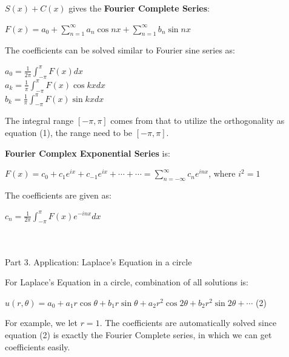 \documentclass{article}
\newenvironment{nscenter}
{\parskip=0pt\par\nopagebreak\centering}
{\par\noindent\ignorespacesafterend}
\begin{document}
\begin{spacing}{1.5}
$S(x) + C(x)$ gives the {\bfseries Fourier Complete Series}:
\begin{nscenter}
	$F(x)=a_0 + \sum_{n=1}^{\infty}a_n \cos nx + \sum_{n=1}^{\infty}b_n \sin nx$
\end{nscenter}
The coefficients can be solved similar to Fourier sine series as:
\begin{nscenter}
	$a_0 = \frac{1}{2\pi} \int_{-\pi}^{\pi} F(x) dx$ \\
	$a_k = \frac{1}{\pi} \int_{-\pi}^{\pi} F(x) \cos kx dx$ \\
	$b_k = \frac{1}{\pi} \int_{-\pi}^{\pi} F(x) \sin kx dx$
\end{nscenter}
The integral range $[-\pi, \pi]$ comes from that to utilize the orthogonality as equation (1), the range need to be $[-\pi, \pi]$.

{\bfseries Fourier Complex Exponential Series} is:
\begin{nscenter}
	$F(x)=c_0 + c_1 e^{ix} + c_{-1} e^{ix} + \cdots + \cdots = \sum_{n=-\infty}^{\infty}c_n e^{inx}$, where $i^2=1$
\end{nscenter}
The coefficients are given as:
\begin{nscenter}
$c_n = \frac{1}{2\pi} \int_{-\pi}^{\pi} F(x) e^{-inx} dx$
\end{nscenter}
\\\\ Part 3.  Application: Laplace's Equation in a circle

For Laplace's Equation in a circle, combination of all solutions is:
\begin{nscenter}
	$u(r, \theta) = a_0 + a_1r\cos\theta + b_1r\sin\theta + a_2r^2\cos2\theta + b_2r^2\sin2\theta+\cdots$ (2)
\end{nscenter}
For example, we let $r=1$. The coefficients are automatically solved since equation (2) is exactly the Fourier Complete series, in which we can get coefficients easily.




























\end{spacing}
\end{document}
